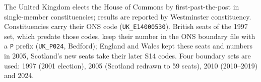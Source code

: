 The United Kingdom elects the House of Commons by first-past-the-post in
single-member constituencies; results are reported by Westminster
constituency.  Constituencies carry
their ONS code (\texttt{UK\_E14000530}).  British seats of the 1997 set, which
predate those codes, keep their number in the ONS boundary file with a
\texttt{P} prefix (\texttt{UK\_P024}, Bedford); England and Wales kept these
seats and numbers in 2005, Scotland's new seats take their later S14 codes.  Four boundary sets are
used: 1997 (2001 election), 2005 (Scotland redrawn to 59 seats), 2010 (2010--2019)
and 2024.
